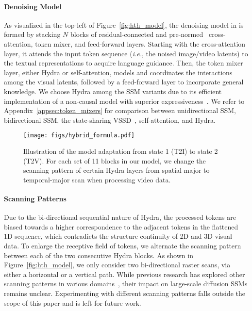 \paragraph{Denoising Model}
As visualized in the top-left of Figure~\ref{fig:hth_model}, the denoising model in \ours{} is formed by stacking $N$ blocks of residual-connected and pre-normed~\citep{xiong2020onlayer,lei2016layernorm} cross-attention, token mixer, and feed-forward layers. Starting with the cross-attention layer, it attends the input token sequence (\textit{i.e.}, the noised image/video latents) to the textual representations to acquire language guidance. Then, the token mixer layer, either Hydra or self-attention, models and coordinates the interactions among the visual latents, followed by a feed-forward layer to incorporate general knowledge. We choose Hydra among the SSM variants due to its efficient implementation of a non-causal model with superior expressiveness~\citep{hwang2024hydra}. We refer to Appendix~\ref{appsec:token_mixers} for comparison between unidirectional SSM, bidirectional SSM, the state-sharing VSSD~\citep{shi2024vssd}, self-attention, and Hydra.


\begin{figure*}[t]
  \centering
  \texttt{[image: figs/hybrid\_formula.pdf]}
  \vspace{-7pt}
  \caption{Illustration of the model adaptation from state 1 (T2I) to state 2 (T2V). For each set of 11 blocks in our \ours{} model, we change the scanning pattern of certain Hydra layers from spatial-major to temporal-major scan when processing video data.}
  \label{fig:hybrid_formula}
  \vspace{-10pt}
\end{figure*}


\paragraph{Scanning Patterns} Due to the bi-directional sequential nature of Hydra, the processed tokens are biased towards a higher correspondence to the adjacent tokens in the flattened 1D sequence, which contradicts the structure continuity of 2D and 3D visual data. To enlarge the receptive field of tokens, we alternate the scanning pattern between each of the two consecutive Hydra blocks. As shown in Figure~\ref{fig:hth_model}, we only consider two bi-directional raster scans, 
via either a horizontal or a vertical path. While previous research has explored other scanning patterns in various domains~\citep{zhang2024surveymamba,xu2024surveymamba}, their impact on large-scale diffusion SSMs remains unclear. Experimenting with different scanning patterns falls outside the scope of this paper and is left for future work.

